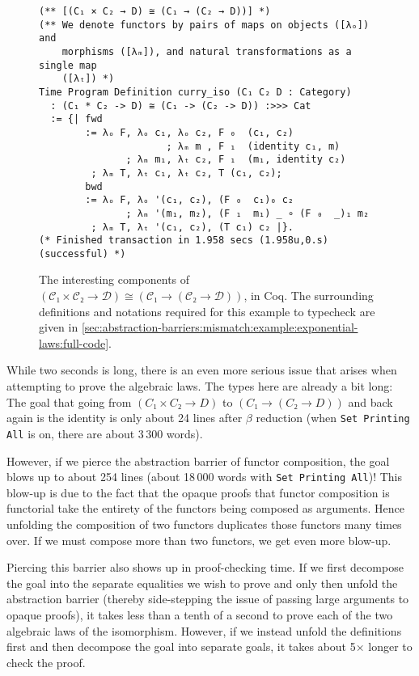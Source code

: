 \begin{figure}
\begin{verbatim}
(** [(C₁ × C₂ → D) ≅ (C₁ → (C₂ → D))] *)
(** We denote functors by pairs of maps on objects ([λₒ]) and
    morphisms ([λₘ]), and natural transformations as a single map
    ([λₜ]) *)
Time Program Definition curry_iso (C₁ C₂ D : Category)
  : (C₁ * C₂ -> D) ≅ (C₁ -> (C₂ -> D)) :>>> Cat
  := {| fwd
        := λₒ F, λₒ c₁, λₒ c₂, F ₀  (c₁, c₂)
                      ; λₘ m , F ₁  (identity c₁, m)
               ; λₘ m₁, λₜ c₂, F ₁  (m₁, identity c₂)
         ; λₘ T, λₜ c₁, λₜ c₂, T (c₁, c₂);
        bwd
        := λₒ F, λₒ '(c₁, c₂), (F ₀  c₁)₀ c₂
               ; λₘ '(m₁, m₂), (F ₁  m₁) _ ∘ (F ₀  _)₁ m₂
         ; λₘ T, λₜ '(c₁, c₂), (T c₁) c₂ |}.
(* Finished transaction in 1.958 secs (1.958u,0.s) (successful) *)
\end{verbatim}
  \caption{%
    \label{fig:exponential-laws:def:coq}%
    The interesting components of $(\mathcal C₁ × \mathcal C₂ → \mathcal D) ≅ (\mathcal C₁ → (\mathcal C₂ → \mathcal D))$, in Coq.
    The surrounding definitions and notations required for this example to typecheck are given in \autoref{sec:abstraction-barriers:mismatch:example:exponential-laws:full-code}.%
  }
\end{figure}

While two seconds is long, there is an even more serious issue that arises when attempting to prove the algebraic laws.
The types here are already a bit long:
The goal that going from $(C₁ × C₂ → D)$ to $(C₁ → (C₂ → D))$ and back again is the identity is only about 24 lines after $\beta$ reduction (when \texttt{Set Printing All} is on, there are about 3\,300 words).

However, if we pierce the abstraction barrier of functor composition, the goal blows up to about 254 lines (about 18\,000 words with \texttt{Set Printing All})!
This blow-up is due to the fact that the opaque proofs that functor composition is functorial take the entirety of the functors being composed as arguments.
Hence unfolding the composition of two functors duplicates those functors many times over.
If we must compose more than two functors, we get even more blow-up.

Piercing this barrier also shows up in proof-checking time.
If we first decompose the goal into the separate equalities we wish to prove and only then unfold the abstraction barrier (thereby side-stepping the issue of passing large arguments to opaque proofs), it takes less than a tenth of a second to prove each of the two algebraic laws of the isomorphism.
However, if we instead unfold the definitions first and then decompose the goal into separate goals, it takes about 5$\times$ longer to check the proof.

